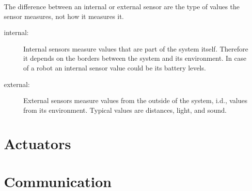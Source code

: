 The difference between an internal or external sensor are the type of values the sensor measures, not how it measures it.
 
\begin{description}
 \item [internal:] Internal sensors measure values that are part of the system itself. Therefore it depends on the borders between the system and its environment. In case of a robot an internal sensor value could be its battery levels.
 \item [external:] External sensors measure values from the outside of the system, i.d., values from its environment. Typical values are distances, light, and sound.
\end{description}


\section{Actuators}
\label{sec:actuators}

\section{Communication}
\label{sec:communication}